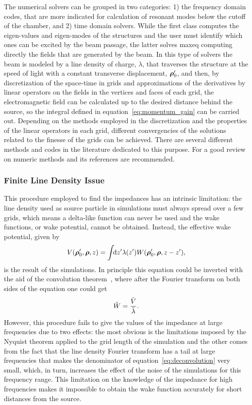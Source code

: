     The numerical solvers can be grouped in two categories: 1) the frequency domain codes, that are more indicated for calculation of resonant modes below the cutoff of the chamber, and 2) time domain solvers. While the first class computes the eigen-values and eigen-modes of the structures and the user must identify which ones can be excited by the beam passage, the latter solves \gls{maxeq} computing directly the fields that are generated by the beam. In this type of solvers the beam is modeled by a line density of charge, $\lambda$, that traverses the structure at the speed of light with a constant transverse displacement, $\boldsymbol{\rho}'_0$, and then, by discretization of the space-time in grids and approximations of the derivatives by linear operators on the fields in the vertices and faces of each grid, the electromagnetic field can be calculated up to the desired distance behind the source, so the integral defined in equation~\eqref{eq:momentum_gain} can be carried out. Depending on the methods employed in the discretization and the properties of the linear operators in each grid, different convergencies of the solutions related to the finesse of the grids can be achieved. There are several different methods and codes in the literature dedicated to this purpose. For a good review on numeric methods  and its references are recommended.

\subsubsection{Finite Line Density Issue}

    This procedure employed to find the impedances has an intrinsic limitation: the line density used as source particle in simulations must always spread over a few grids, which means a delta-like function can never be used and the wake functions, or wake potential, cannot be obtained. Instead, the effective wake potential, given by
    \begin{align}
        V(\boldsymbol{\rho}'_0, \boldsymbol{\rho}, z) = \int\!\!\text{d}z' 
                \lambda(z') W(\boldsymbol{\rho}'_0,\boldsymbol{\rho},z-z'),
    \end{align}
    is the result of the simulations. In principle this equation could be inverted with the aid of the convolution theorem~\cite{wiki2017a}, where after the Fourier transform on both sides of the equation one could get
    \begin{align}\label{eq:deconvolution}
        \tilde{W} = \frac{\tilde{V}}{\tilde{\lambda}}.
    \end{align}
    However, this procedure fails to give the values of the impedance at large frequencies due to two effects: the most obvious is the limitations imposed by the Nyquist theorem applied to the grid length of the simulation and the other comes from the fact that the line density Fourier transform has a tail at large frequencies that makes the denominator of equation~\eqref{eq:deconvolution} very small, which, in turn, increases the effect of the noise of the simulations for this frequency range. This limitation on the knowledge of the impedance for high frequencies makes it impossible to obtain the wake function accurately for short distances from the source.

